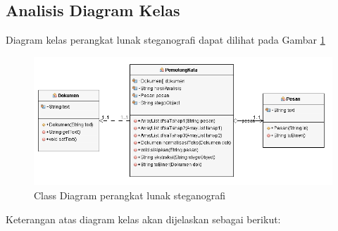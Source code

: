 \subsection{Analisis Diagram Kelas}

Diagram kelas perangkat lunak steganografi dapat dilihat pada Gambar \ref{fig:3_classdiagram}

\begin{figure}[H]
	\centering
	\includegraphics[scale=0.8]{Gambar/classdiagram}
	\caption{Class Diagram perangkat lunak steganografi} 
	\label{fig:3_classdiagram}
\end{figure}

Keterangan atas diagram kelas akan dijelaskan sebagai berikut:

